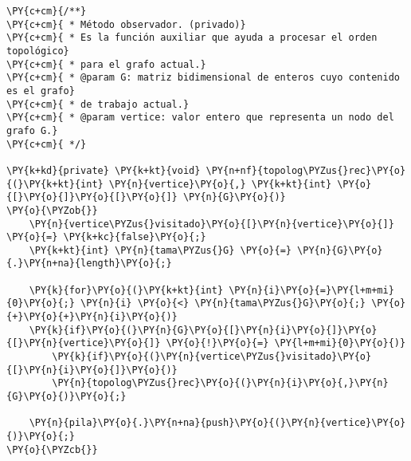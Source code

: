 \begin{Verbatim}[commandchars=\\\{\}]
\PY{c+cm}{/**}
\PY{c+cm}{ * Método observador. (privado)}
\PY{c+cm}{ * Es la función auxiliar que ayuda a procesar el orden topológico}
\PY{c+cm}{ * para el grafo actual.}
\PY{c+cm}{ * @param G: matriz bidimensional de enteros cuyo contenido es el grafo}
\PY{c+cm}{ * de trabajo actual.}
\PY{c+cm}{ * @param vertice: valor entero que representa un nodo del grafo G.}
\PY{c+cm}{ */}

\PY{k+kd}{private} \PY{k+kt}{void} \PY{n+nf}{topolog\PYZus{}rec}\PY{o}{(}\PY{k+kt}{int} \PY{n}{vertice}\PY{o}{,} \PY{k+kt}{int} \PY{o}{[}\PY{o}{]}\PY{o}{[}\PY{o}{]} \PY{n}{G}\PY{o}{)}
\PY{o}{\PYZob{}}
    \PY{n}{vertice\PYZus{}visitado}\PY{o}{[}\PY{n}{vertice}\PY{o}{]} \PY{o}{=} \PY{k+kc}{false}\PY{o}{;}
    \PY{k+kt}{int} \PY{n}{tama\PYZus{}G} \PY{o}{=} \PY{n}{G}\PY{o}{.}\PY{n+na}{length}\PY{o}{;}

    \PY{k}{for}\PY{o}{(}\PY{k+kt}{int} \PY{n}{i}\PY{o}{=}\PY{l+m+mi}{0}\PY{o}{;} \PY{n}{i} \PY{o}{<} \PY{n}{tama\PYZus{}G}\PY{o}{;} \PY{o}{+}\PY{o}{+}\PY{n}{i}\PY{o}{)}
	\PY{k}{if}\PY{o}{(}\PY{n}{G}\PY{o}{[}\PY{n}{i}\PY{o}{]}\PY{o}{[}\PY{n}{vertice}\PY{o}{]} \PY{o}{!}\PY{o}{=} \PY{l+m+mi}{0}\PY{o}{)}
	    \PY{k}{if}\PY{o}{(}\PY{n}{vertice\PYZus{}visitado}\PY{o}{[}\PY{n}{i}\PY{o}{]}\PY{o}{)}
		\PY{n}{topolog\PYZus{}rec}\PY{o}{(}\PY{n}{i}\PY{o}{,}\PY{n}{G}\PY{o}{)}\PY{o}{;}

    \PY{n}{pila}\PY{o}{.}\PY{n+na}{push}\PY{o}{(}\PY{n}{vertice}\PY{o}{)}\PY{o}{;}
\PY{o}{\PYZcb{}}
\end{Verbatim}
